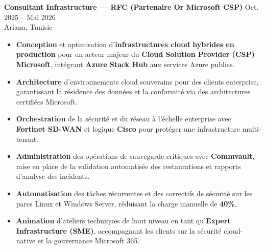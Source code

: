 \documentclass[10pt, letterpaper]{article}
\newenvironment{highlights}{
\begin{itemize}[leftmargin=12pt, itemsep=2pt]
}{
\end{itemize}
}
\begin{document}
\textbf{Consultant Infrastructure --- RFC (Partenaire Or Microsoft CSP)} \hfill Oct. 2025 -- Mai 2026 \\
Ariana, Tunisie
\begin{highlights}
\item \textbf{Conception} et optimisation d'\textbf{infrastructures cloud hybrides en production} pour un acteur majeur du \textbf{Cloud Solution Provider (CSP) Microsoft}, intégrant \textbf{Azure Stack Hub} aux services Azure publics.
\item \textbf{Architecture} d'environnements cloud souverains pour des clients enterprise, garantissant la résidence des données et la conformité via des architectures certifiées Microsoft.
\item \textbf{Orchestration} de la sécurité et du réseau à l'échelle enterprise avec \textbf{Fortinet SD-WAN} et logique \textbf{Cisco} pour protéger une infrastructure multi-tenant.
\item \textbf{Administration} des opérations de sauvegarde critiques avec \textbf{Commvault}, mise en place de la validation automatisée des restaurations et rapports d'analyse des incidents.
\item \textbf{Automatisation} des tâches récurrentes et des correctifs de sécurité sur les parcs Linux et Windows Server, réduisant la charge manuelle de \textbf{40\%}.
\item \textbf{Animation} d'ateliers techniques de haut niveau en tant qu'\textbf{Expert Infrastructure (SME)}, accompagnant les clients sur la sécurité cloud-native et la gouvernance Microsoft 365.
\end{highlights}
\end{document}
